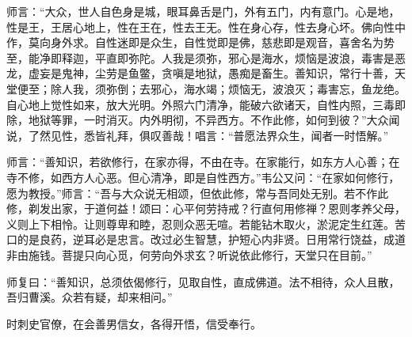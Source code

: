 \documentclass[12pt,twoside,openany]{book}
\begin{document}
师言：“大众，世人自色身是城，眼耳鼻舌是门，外有五门，内有意门。心是地，性是王，王居心地上，性在王在，性去王无。性在身心存，性去身心坏。佛向性中作，莫向身外求。自性迷即是众生，自性觉即是佛，慈悲即是观音，喜舍名为势至，能净即释迦，平直即弥陀。人我是须弥，邪心是海水，烦恼是波浪，毒害是恶龙，虚妄是鬼神，尘劳是鱼鳖，贪嗔是地狱，愚痴是畜生。善知识，常行十善，天堂便至；除人我，须弥倒；去邪心，海水竭；烦恼无，波浪灭；毒害忘，鱼龙绝。自心地上觉性如来，放大光明。外照六门清净，能破六欲诸天，自性内照，三毒即除，地狱等罪，一时消灭。内外明彻，不异西方。不作此修，如何到彼？”大众闻说，了然见性，悉皆礼拜，俱叹善哉！唱言：“普愿法界众生，闻者一时悟解。”

师言：“善知识，若欲修行，在家亦得，不由在寺。在家能行，如东方人心善；在寺不修，如西方人心恶。但心清净，即是自性西方。”韦公又问：“在家如何修行，愿为教授。”师言：“吾与大众说无相颂，但依此修，常与吾同处无别。若不作此修，剃发出家，于道何益！颂曰：心平何劳持戒？行直何用修禅？恩则孝养父母，义则上下相怜。让则尊卑和睦，忍则众恶无喧。若能钻木取火，淤泥定生红莲。苦口的是良药，逆耳必是忠言。改过必生智慧，护短心内非贤。日用常行饶益，成道非由施钱。菩提只向心觅，何劳向外求玄？听说依此修行，天堂只在目前。”

师复曰：“善知识，总须依偈修行，见取自性，直成佛道。法不相待，众人且散，吾归曹溪。众若有疑，却来相问。”

时刺史官僚，在会善男信女，各得开悟，信受奉行。
\end{document}
